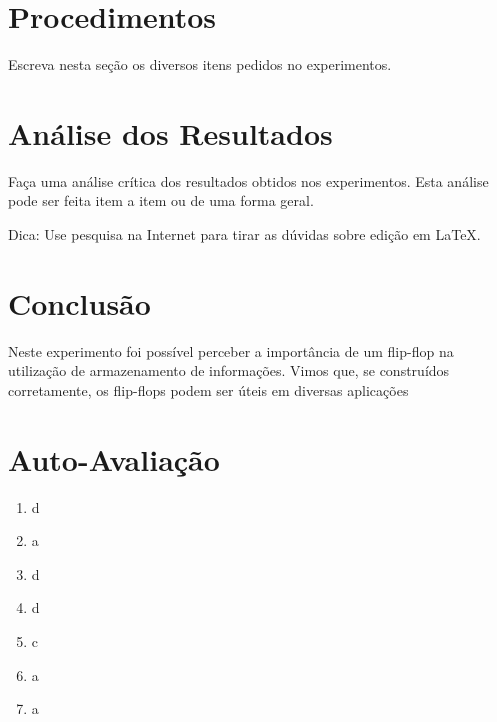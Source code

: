 \documentclass[12pt]{article}
\begin{document}
\section{Procedimentos}
\label{sec:Procedimentos}

Escreva nesta seção os diversos itens pedidos no experimentos. 


\section{Análise dos Resultados}
\label{sec:Resultados}

Faça uma análise crítica dos resultados obtidos nos experimentos. Esta análise pode ser feita item a item ou de uma forma geral.

Dica: Use pesquisa na Internet para tirar as dúvidas sobre edição em \LaTeX .

\section{Conclusão}
\label{sec:Conclusao}

Neste experimento foi possível perceber a importância de um flip-flop na utilização de armazenamento de informações. Vimos que, se construídos corretamente, os flip-flops podem ser úteis em diversas aplicações

\newpage 
\section*{Auto-Avaliação}

\begin{enumerate}
    \item d
    \item a
    \item d
    \item d
    \item c
    \item a
    \item a
\end{enumerate}
\end{document}
